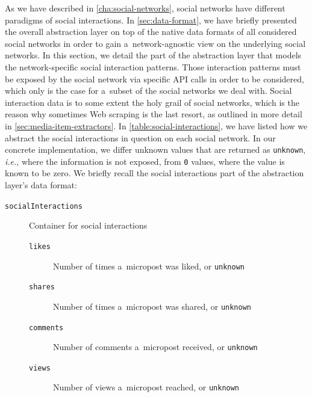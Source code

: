 As we have described in \autoref{cha:social-networks},
social networks have different paradigms of social interactions.
In \autoref{sec:data-format}, we have briefly presented the overall
abstraction layer on top of the native data formats
of all considered social networks in order to gain
a~network-agnostic view on the underlying social networks.
In this section, we detail the part of the abstraction layer
that models the network-specific social interaction patterns.
Those interaction patterns must be exposed by the social network 
via specific API calls in order to be considered,
which only is the case for a~subset of the social networks we deal with.
Social interaction data is to some extent the holy grail of social networks,
which is the reason why sometimes Web scraping is the last resort,
as outlined in more detail in \autoref{sec:media-item-extractors}.
In \autoref{table:social-interactions}, we have listed
how we abstract the social interactions in question on each social network.
In our concrete implementation, we differ unknown values
that are returned as \texttt{unknown}, \emph{i.e.},
where the information is not exposed,
from \texttt{0} values, where the value is known to be zero.
We briefly recall the social interactions part
of the abstraction layer's data format:

\begin{description}
  \item[\texttt{socialInteractions}] Container for social
    interactions
  \begin{description}  
  \item[\texttt{likes}] Number of times a~micropost was liked, or
    \texttt{unknown}
  \item[\texttt{shares}] Number of times a~micropost was shared, or
    \texttt{unknown}
  \item[\texttt{comments}] Number of comments a~micropost
    received, or \texttt{unknown}
  \item[\texttt{views}] Number of views a~micropost reached, or
    \texttt{unknown}
  \end{description}    
\end{description}

